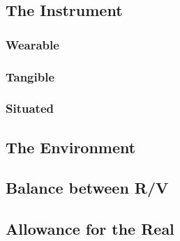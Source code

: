 \subsection{The Instrument}
\subsubsection{Wearable}
\subsubsection{Tangible}
\subsubsection{Situated}

\subsection{The Environment}
\subsection{Balance between R/V}
\subsection{Allowance for the Real}

